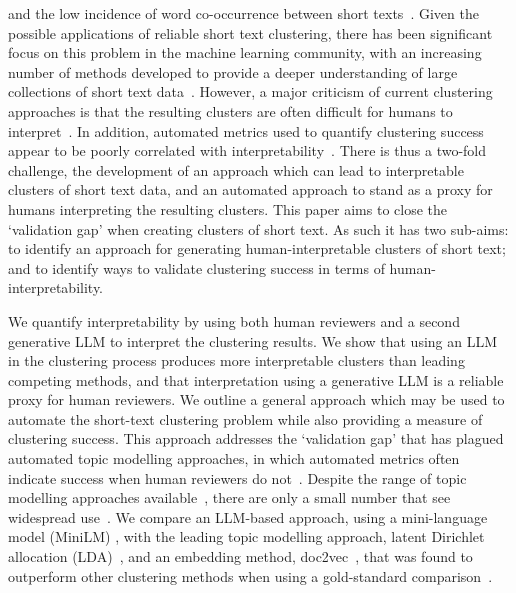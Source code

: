 \documentclass{article}
\begin{document}
and the low incidence of word co-occurrence between short texts~\cite{hong2010,cheng2014}. Given the possible applications of reliable short text clustering, there has been significant focus on this problem in the machine learning community, with an increasing number of methods developed to provide a deeper understanding of large collections of short text data~\cite{ahmed2022short,qiang2022}. However, a major criticism of current clustering approaches is that the resulting clusters are often difficult for humans to interpret~\cite{doogan2021}.  In addition, automated metrics used to quantify clustering success appear to be poorly correlated with interpretability~\cite{chang2009}.  There is thus a two-fold challenge, the development of an approach which can lead to interpretable clusters of short text data, and an automated approach to stand as a proxy for humans interpreting the resulting clusters.
This paper aims to close the `validation gap' when creating clusters of short text.  As such it has two sub-aims: to identify an approach for generating human-interpretable clusters of short text; and to identify ways to validate clustering success in terms of human-interpretability.



We quantify interpretability by using both human reviewers and a second generative LLM to interpret the clustering results.  We show that using an LLM in the clustering process produces more interpretable clusters than leading competing methods, and that interpretation using a generative LLM is a reliable proxy for human reviewers.  We outline a general approach which may be used to automate the short-text clustering problem while also providing a measure of clustering success.  This approach addresses the `validation gap' that has plagued automated topic modelling approaches, in which automated metrics often indicate success when human reviewers do not~\cite{hoyle2021}.  Despite the range of topic modelling approaches available~\cite{churchill2022evolution}, there are only a small number that see widespread use~\cite{ahmed2022short}.  We compare an LLM-based approach, using a mini-language model (MiniLM) , with the leading topic modelling approach, latent Dirichlet allocation (LDA)~\cite{blei2003}, and an embedding method, doc2vec~\cite{le2014}, that was found to outperform other clustering methods when using a gold-standard comparison~\cite{curiskis2020}.  
\end{document}
